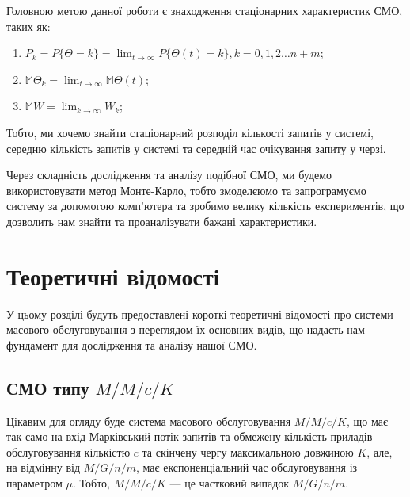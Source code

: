 \documentclass[14pt]{extarticle}
\begin{document}
Головною метою данної роботи є знаходження стаціонарних характеристик СМО, таких
як:

\begin{enumerate}
  \item \(P_{k} = P\{\Theta = k\} = \lim_{t \to \infty}P\{\Theta(t) = k\}, k = 0,1,2 \ldots n+m\);
  \item \(\mathbb{M} \Theta_k = \lim_{t \to \infty} \mathbb{M} \Theta(t)\);
  \item \(\mathbb{M} W = \lim_{k \to \infty} W_k \);
\end{enumerate}

Тобто, ми хочемо знайти стаціонарний розподіл кількості запитів у системі, середню
кількість запитів у системі та середній час очікування запиту у черзі.

Через складність дослідження та аналізу подібної СМО, ми будемо використовувати
метод Монте-Карло, тобто змоделєюмо та запрограмуємо систему за допомогою
комп'ютера та зробимо велику кількість експериментів, що дозволить нам знайти та
проаналізувати бажані характеристики.

\newpage

\section{Теоретичні відомості}

У цьому розділі будуть предоставлені короткі теоретичні відомості про системи
масового обслуговування з переглядом їх основних видів, що надасть нам
фундамент для дослідження та аналізу нашої СМО.

\subsection{СМО типу \(M/M/c/K\)}\label{sec:mmck}

Цікавим для огляду буде система масового обслуговування \(M/M/c/K\), що має так
само на вхід Марківський потік запитів та обмежену кількість приладів
обслуговування кількістю \(c\) та скінчену чергу максимальною довжиною \(K\),
але, на відмінну від \(M/G/n/m\), має експоненціальний час обслуговування із
параметром \(\mu\). Тобто, \(M/M/c/K\) --- це частковий випадок \(M/G/n/m\).
\end{document}
